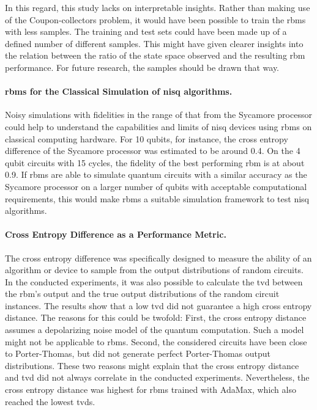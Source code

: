 In this regard, this study lacks on interpretable insights. Rather than making use of the 
Coupon-collectors problem, it would have been possible to train the \gls{rbm}s with less samples. 
The training and test sets could have been made up of a defined number of different 
samples. This might have given clearer insights into the relation between the ratio of the 
state space observed and the resulting \gls{rbm} performance. For future research, the samples should
be drawn that way.

\paragraph{\gls{rbm}s for the Classical Simulation of \gls{nisq} algorithms.}
Noisy simulations with 
fidelities in the range of that from the Sycamore processor could help to understand the 
capabilities and limits of \gls{nisq} devices using \gls{rbm}s on classical computing hardware. 
For 10 qubits, for instance, the cross entropy difference
of the Sycamore processor was estimated to be around 0.4. On the 4 qubit circuits with 
15 cycles, the fidelity of the best performing \gls{rbm} is at about 0.9. 
If \gls{rbm}s are able to simulate quantum circuits with a similar accuracy as the Sycamore 
processor on a larger number of qubits with acceptable computational requirements, this 
would make \gls{rbm}s a suitable simulation framework to test \gls{nisq} algorithms.

\paragraph{Cross Entropy Difference as a Performance Metric.}
The cross entropy difference was specifically designed to measure the 
ability of an algorithm or device to sample from the output distributions of 
random circuits. In the conducted experiments, it was also possible to 
calculate the \gls{tvd} between the \gls{rbm}'s output and the true output distributions of 
the random circuit instances. The results show that a low \gls{tvd} did not guarantee a 
high cross entropy distance. The reasons for this could be twofold: First, the 
cross entropy distance assumes a depolarizing noise model of the quantum computation. 
Such a model might not be applicable to \gls{rbm}s. Second, the considered circuits have been 
close to Porter-Thomas, but did not generate perfect Porter-Thomas output distributions.
These two reasons might explain that the cross entropy distance and \gls{tvd} did not 
always correlate in the conducted experiments. Nevertheless, the cross entropy distance 
was highest for \gls{rbm}s trained with AdaMax, which also reached the lowest \gls{tvd}s.


